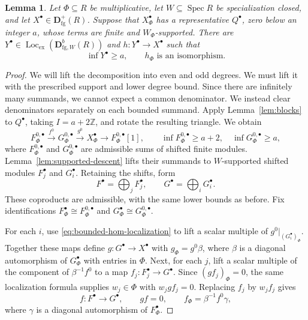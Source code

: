 \documentclass[11pt]{amsart}
\numberwithin{equation}{section}
\newtheorem{lemma}[theorem]{Lemma}
\theoremstyle{definition}
\theoremstyle{remark}
\DeclareMathOperator{\Spec}{Spec}
\DeclareMathOperator{\Loc}{Loc}
\newcommand{\D}{\mathbf D}
\newcommand{\fg}{\mathrm{fg}}
\newcommand{\Lex}{\Loc_{\mathrm{ex}}}
\begin{document}
\begin{lemma}\label{lem:scalar-spreading}
Let $\Phi\subseteq R$ be multiplicative, let $W\subseteq\Spec R$ be
specialization closed, and let $X^{\bullet}\in\D^+_{\fg}(R)$.
Suppose that $X_\Phi^{\bullet}$ has a representative $Q^{\bullet}$, zero below an integer
$a$, whose terms are finite and $W_\Phi$-supported.
There are $Y^{\bullet}\in\Lex(\D^b_{\fg,W}(R))$ and $h:Y^{\bullet}\to X^{\bullet}$ such that
\begin{equation}\label{eq:scalar-spreading}
 \inf Y^{\bullet}\geq a,\qquad h_\Phi\text{ is an isomorphism}.
\end{equation}
\end{lemma}
\begin{proof}
We will lift the decomposition into even and odd degrees. We must lift it with the prescribed support and lower
degree bound. Since there are infinitely many summands, we cannot
expect a common denominator. We instead clear denominators separately
on each bounded summand.
Apply Lemma~\ref{lem:blocks} to $Q^{\bullet}$, taking $I=a+2\mathbb Z$,
and rotate the resulting triangle. We obtain
\[
 F_\Phi^{0,\bullet}\xrightarrow{f^0}G_\Phi^{0,\bullet}
 \xrightarrow{g^0}X_\Phi^{\bullet}\longrightarrow F_\Phi^{0,\bullet}[1],
 \qquad \inf F_\Phi^{0,\bullet}\geq a+2,\quad \inf G_\Phi^{0,\bullet}\geq a,
\]
where $F_\Phi^{0,\bullet}$ and $G_\Phi^{0,\bullet}$ are admissible sums of shifted finite
modules. Lemma~\ref{lem:supported-descent} lifts their summands to
$W$-supported shifted modules $F_j^{\bullet}$ and $G_i^{\bullet}$. Retaining the shifts, form
\[
 F^{\bullet}=\bigoplus_j F_j^{\bullet},\qquad G^{\bullet}=\bigoplus_i G_i^{\bullet}.
\]
These coproducts are admissible, with the same lower bounds as before. Fix identifications
$F_\Phi^{\bullet}\cong F_\Phi^{0,\bullet}$ and $G_\Phi^{\bullet}\cong G_\Phi^{0,\bullet}$.

For each $i$, use \eqref{eq:bounded-hom-localization} to lift a
scalar multiple of $g^0|_{(G_i^{\bullet})_\Phi}$. Together these maps define
$g:G^{\bullet}\to X^{\bullet}$ with $g_\Phi=g^0\beta$, where $\beta$ is a
diagonal automorphism of $G_\Phi^{\bullet}$ with entries in $\Phi$.
Next, for each $j$, lift a scalar multiple of the component of
$\beta^{-1}f^0$ to a map $f_j:F_j^{\bullet}\to G^{\bullet}$.
Since $(gf_j)_\Phi=0$, the same localization formula supplies
$w_j\in\Phi$ with $w_jgf_j=0$. Replacing $f_j$ by $w_jf_j$ gives
\begin{equation}\label{eq:gf}
 f:F^{\bullet}\longrightarrow G^{\bullet},\qquad gf=0,
 \qquad f_\Phi=\beta^{-1}f^0\gamma,
\end{equation}
where $\gamma$ is a diagonal automorphism of $F_\Phi^{\bullet}$.


\end{proof}
\end{document}
